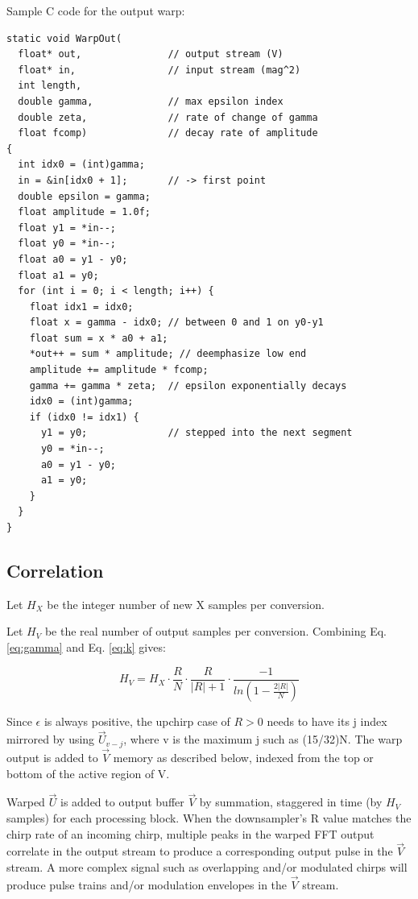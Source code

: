 Sample C code for the output warp:

\begin{lstlisting}[float,floatplacement=H]
static void WarpOut(
  float* out,               // output stream (V)
  float* in,                // input stream (mag^2)
  int length,
  double gamma,             // max epsilon index
  double zeta,              // rate of change of gamma
  float fcomp)              // decay rate of amplitude
{
  int idx0 = (int)gamma;
  in = &in[idx0 + 1];       // -> first point
  double epsilon = gamma;
  float amplitude = 1.0f;
  float y1 = *in--;
  float y0 = *in--;
  float a0 = y1 - y0;
  float a1 = y0;
  for (int i = 0; i < length; i++) {
    float idx1 = idx0;
    float x = gamma - idx0; // between 0 and 1 on y0-y1
    float sum = x * a0 + a1;
    *out++ = sum * amplitude; // deemphasize low end
    amplitude += amplitude * fcomp;
    gamma += gamma * zeta;  // epsilon exponentially decays
    idx0 = (int)gamma;
    if (idx0 != idx1) {
      y1 = y0;              // stepped into the next segment
      y0 = *in--;
      a0 = y1 - y0;
      a1 = y0;
    }
  }
}
\end{lstlisting}


\subsection{Correlation}

Let $H_X$ be the integer number of new X samples per conversion.

Let $H_V$ be the real number of output samples per conversion.
Combining Eq. \ref{eq:gamma} and Eq. \ref{eq:k} gives:

\begin{equation}  \label{eq:hv}
H_V = H_X \cdot \frac{R}{N} \cdot \frac{R}{|R| + 1}
          \cdot \frac{-1}{ln(1 - \frac{2|R|}{N})}
\end{equation}

Since $\epsilon$ is always positive, the upchirp case of $R>0$ needs to have its
j index mirrored by using $\vec{U}_{v-j}$, where v is the maximum j such as (15/32)N.
The warp output is added to $\vec{V}$ memory as described below, indexed from the
top or bottom of the active region of V.

Warped $\vec{U}$ is added to output buffer $\vec{V}$ by summation,
staggered in time (by $H_V$ samples) for each processing block.
When the downsampler's R value matches the chirp rate of an incoming chirp,
multiple peaks in the warped FFT output correlate in the output stream to
produce a corresponding output pulse in the $\vec{V}$ stream.
A more complex signal such as overlapping and/or modulated chirps will produce
pulse trains and/or modulation envelopes in the $\vec{V}$ stream.

